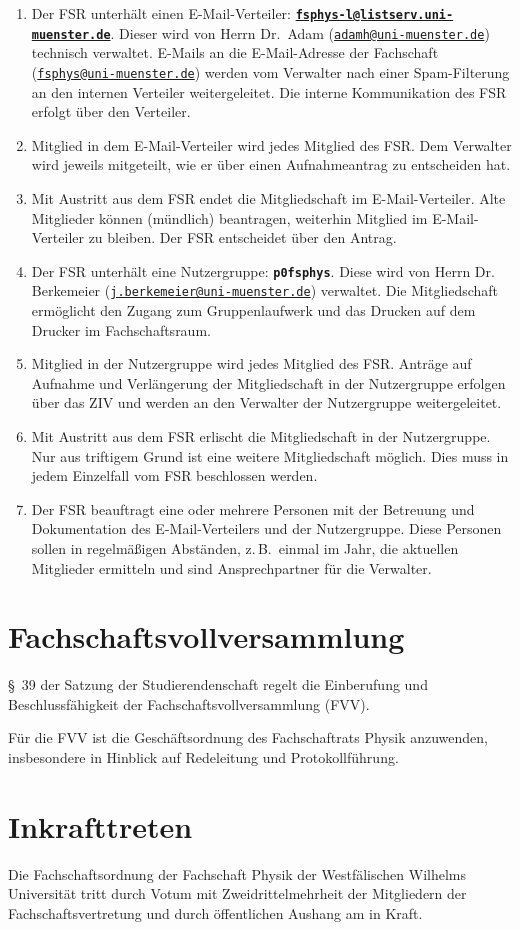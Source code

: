 \documentclass[
	a4paper,
	12pt,
	oneside,
	parskip=half-,
	pagesize,
	headsepline,
	german,
	ngerman
]{scrartcl}
\newcommand{\email}[1]{\href{mailto:#1}{\texttt{#1}}}
\begin{document}
\begin{enumerate}
	\item Der FSR unterhält einen E-Mail-Verteiler: \textbf{\email{fsphys-l@listserv.uni-muenster.de}}. Dieser wird von Herrn Dr.\ Adam (\email{adamh@uni-muenster.de}) technisch verwaltet. E-Mails an die E-Mail-Adresse der Fachschaft (\email{fsphys@uni-muenster.de}) werden vom Verwalter nach einer Spam-Filterung an den internen Verteiler weitergeleitet. Die interne Kommunikation des FSR erfolgt über den Verteiler.
	\item Mitglied in dem E-Mail-Verteiler wird jedes Mitglied des FSR. Dem Verwalter wird jeweils mitgeteilt, wie er über einen Aufnahmeantrag zu entscheiden hat.
	\item Mit Austritt aus dem FSR endet die Mitgliedschaft im E-Mail-Verteiler. Alte Mitglieder können (mündlich) beantragen, weiterhin Mitglied im E-Mail-Verteiler zu bleiben. Der FSR entscheidet über den Antrag.
	\item Der FSR unterhält eine Nutzergruppe: \textbf{\texttt{p0fsphys}}. Diese wird von Herrn Dr. Berkemeier (\email{j.berkemeier@uni-muenster.de}) verwaltet. Die Mitgliedschaft ermöglicht den Zugang zum Gruppenlaufwerk und das Drucken auf dem Drucker im Fachschaftsraum.
	\item Mitglied in der Nutzergruppe wird jedes Mitglied des FSR. Anträge auf Aufnahme und Verlängerung der Mitgliedschaft in der Nutzergruppe erfolgen über das ZIV und werden an den Verwalter der Nutzergruppe weitergeleitet.
	\item Mit Austritt aus dem FSR erlischt die Mitgliedschaft in der Nutzergruppe. Nur aus triftigem Grund ist eine weitere Mitgliedschaft möglich. Dies muss in jedem Einzelfall vom FSR beschlossen werden.
	\item Der FSR beauftragt eine oder mehrere Personen mit der Betreuung und Dokumentation des E-Mail-Verteilers und der Nutzergruppe. Diese Personen sollen in regelmäßigen Abständen, z.\,B.\ einmal im Jahr, die aktuellen Mitglieder ermitteln und sind Ansprechpartner für die Verwalter.
	\label{item:Ansprechpartner}
\end{enumerate}

\section{Fachschaftsvollversammlung}
§~39 der Satzung der Studierendenschaft regelt die Einberufung und Beschlussfähigkeit der Fachschaftsvollversammlung (FVV).

Für die FVV ist die Geschäftsordnung des Fachschaftrats Physik anzuwenden, insbesondere in Hinblick auf Redeleitung und Protokollführung.

\section{Inkrafttreten}
Die Fachschaftsordnung der Fachschaft Physik der Westfälischen Wilhelms Universität tritt durch Votum mit Zweidrittelmehrheit der Mitgliedern der Fachschaftsvertretung und durch öffentlichen Aushang am  in Kraft.
\end{document}
